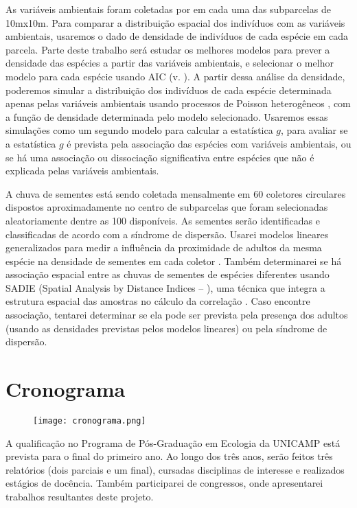 \documentclass[twoside,12pt,a4paper]{report}
\begin{document}
As variáveis ambientais foram coletadas por \cite{Kelly} em cada uma das subparcelas de 10mx10m.
Para comparar a distribuição espacial dos indivíduos com as variáveis ambientais, usaremos o dado de
densidade de indivíduos de cada espécie em cada parcela. Parte deste trabalho será estudar os
melhores modelos para prever a densidade das espécies a partir das variáveis ambientais, e
selecionar o melhor modelo para cada espécie usando AIC (v. \cite{Bagchi2011,Henrys2009}). A partir
dessa análise da densidade, poderemos simular a distribuição dos indivíduos de cada espécie
determinada apenas pelas variáveis ambientais usando processos de Poisson heterogêneos
\citep{WiegandBook}, com a função de densidade determinada pelo modelo selecionado. Usaremos essas
simulações como um segundo modelo para calcular a estatística $g$, para avaliar se a
estatística $g$ é prevista pela associação das espécies com variáveis ambientais, ou se há uma
associação ou dissociação significativa entre espécies que não é explicada pelas variáveis
ambientais.

A chuva de sementes está sendo coletada mensalmente em 60 coletores circulares dispostos
aproximadamente no centro de subparcelas que foram selecionadas aleatoriamente dentre as 100
disponíveis. As sementes serão identificadas e classificadas de acordo com a síndrome de dispersão.
Usarei modelos lineares generalizados para medir a influência da proximidade de adultos da mesma
espécie na densidade de sementes em cada coletor \citep{Hardesty2002}. Também determinarei se há
associação espacial entre as
chuvas de sementes de espécies diferentes usando SADIE (Spatial Analysis by Distance Indices –
\cite{Perry1995}), uma técnica que integra a estrutura espacial das amostras no cálculo da
correlação \citep{Li2012}. Caso encontre associação, tentarei determinar se ela pode ser prevista pela presença dos adultos (usando as densidades previstas pelos
modelos lineares) ou pela síndrome de dispersão.

\section{Cronograma}

	\begin{figure}[ht]
		\centering \texttt{[image: cronograma.png]}
    \end{figure}

A qualificação no Programa de Pós-Graduação em Ecologia da UNICAMP está prevista para o final do
primeiro ano. Ao longo dos três anos, serão feitos três relatórios (dois parciais e um final),
cursadas disciplinas de interesse e realizados estágios de docência. Também participarei de
congressos, onde apresentarei trabalhos resultantes deste projeto.
\end{document}
